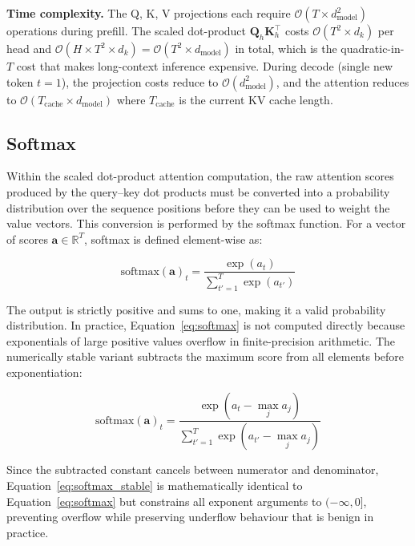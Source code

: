 \noindent\textbf{Time complexity.} The Q, K, V projections each require
$\mathcal{O}(T \times d_{\text{model}}^2)$ operations during prefill.
The scaled dot-product $\mathbf{Q}_h \mathbf{K}_h^\top$ costs
$\mathcal{O}(T^2 \times d_k)$ per head and
$\mathcal{O}(H \times T^2 \times d_k) = \mathcal{O}(T^2 \times
d_{\text{model}})$ in total, which is the quadratic-in-$T$ cost that
makes long-context inference expensive. During decode (single new token
$t = 1$), the projection costs reduce to
$\mathcal{O}(d_{\text{model}}^2)$, and the attention reduces to
$\mathcal{O}(T_{\text{cache}} \times d_{\text{model}})$ where
$T_{\text{cache}}$ is the current KV cache length.


\subsection{Softmax}
\label{subsec:softmax}

Within the scaled dot-product attention computation, the raw attention
scores produced by the query--key dot products must be converted into a
probability distribution over the sequence positions before they can be
used to weight the value vectors. This conversion is performed by the
softmax function. For a vector of scores
$\mathbf{a} \in \mathbb{R}^{T}$, softmax is defined element-wise as:

\begin{equation}
  \text{softmax}(\mathbf{a})_t = \frac{\exp(a_t)}{\sum_{t'=1}^{T} \exp(a_{t'})}
  \label{eq:softmax}
\end{equation}

\noindent The output is strictly positive and sums to one, making it a
valid probability distribution. In practice, Equation~\ref{eq:softmax}
is not computed directly because exponentials of large positive values
overflow in finite-precision arithmetic. The numerically stable variant
subtracts the maximum score from all elements before exponentiation:

\begin{equation}
  \text{softmax}(\mathbf{a})_t =
    \frac{\exp(a_t - \max_j a_j)}{\sum_{t'=1}^{T} \exp(a_{t'} - \max_j a_j)}
  \label{eq:softmax_stable}
\end{equation}

\noindent Since the subtracted constant cancels between numerator and
denominator, Equation~\ref{eq:softmax_stable} is mathematically identical
to Equation~\ref{eq:softmax} but constrains all exponent arguments to
$(-\infty, 0]$, preventing overflow while preserving underflow behaviour
that is benign in practice.

